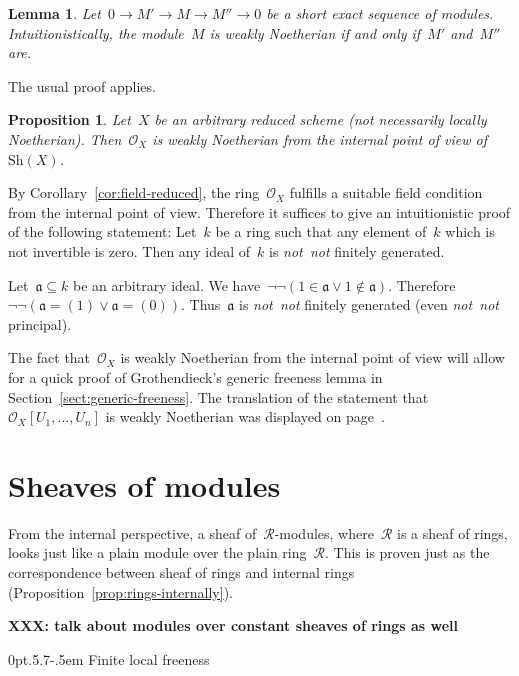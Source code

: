 \documentclass[10pt,reqno,a4paper]{amsbook}
\makeatletter
\theoremstyle{definition}
\theoremstyle{plain}
\newtheorem{prop}[defn]{Proposition}
\newtheorem{lemma}[defn]{Lemma}
\theoremstyle{remark}
\renewcommand{\O}{\mathcal{O}}
\newcommand{\R}{\mathcal{R}}
\newcommand{\aaa}{\mathfrak{a}}
\newcommand{\Sh}{\mathrm{Sh}}
\newcommand{\?}{\,{:}\,}
\renewcommand{\_}{\mathpunct{.}\,}
\newcommand{\notnot}{\emph{not~not}\xspace}
\newcommand{\XXX}[1]{\textbf{XXX: #1}}
\renewenvironment{proof}[1][\proofname]{\par
  \pushQED{\qed}%
  \normalfont \topsep6\p@\@plus6\p@\relax
  \trivlist
  \item[\hskip\labelsep
        \itshape
    #1\@addpunct{.}]\ignorespaces
}{%
  \popQED\endtrivlist\@endpefalse
}
\def\subsection{\@startsection{subsection}{2}%
  {0pt}{.5\linespacing\@plus.7\linespacing}{-.5em}%
  {\normalfont\bfseries}}
\makeatother
\begin{document}
{\begin{lemma}Let~$0 \to M' \to M \to M'' \to 0$ be a short exact sequence of
modules. Intuitionistically, the module~$M$ is weakly Noetherian if and only
if~$M'$ and~$M''$ are.
\end{lemma}

\begin{proof}The usual proof applies.\end{proof}

\begin{prop}\label{prop:ox-weakly-noetherian}
Let~$X$ be an arbitrary reduced scheme (not necessarily locally
Noetherian). Then~$\O_X$ is weakly Noetherian from the internal point of view
of~$\Sh(X)$.\end{prop}
\begin{proof}By Corollary~\ref{cor:field-reduced}, the ring~$\O_X$ fulfills a
suitable field condition from the internal point of view. Therefore it suffices
to give an intuitionistic proof of the following statement: Let~$k$ be a ring such that
any element of~$k$ which is not invertible is zero. Then any ideal of~$k$ is
\notnot finitely generated.

Let~$\aaa \subseteq k$ be an arbitrary ideal. We have~$\neg\neg(1 \in \aaa \vee
1 \not\in \aaa)$. Therefore~$\neg\neg(\aaa = (1) \vee \aaa = (0))$. Thus~$\aaa$
is \notnot finitely generated (even \notnot principal).
\end{proof}

The fact that~$\O_X$ is weakly Noetherian from the internal point of view will
allow for a quick proof of Grothendieck's generic freeness lemma in
Section~\ref{sect:generic-freeness}. The translation of the statement
that~$\O_X[U_1,\ldots,U_n]$ is weakly Noetherian was displayed on
page~\pageref{page:convoluted-statement}.

}


\section{Sheaves of modules}

From the internal perspective, a sheaf of~$\R$-modules, where~$\R$ is a sheaf
of rings, looks just like a plain module over the plain ring~$\R$. This is
proven just as the correspondence between sheaf of rings and internal rings
(Proposition~\ref{prop:rings-internally}).

\XXX{talk about modules over constant sheaves of rings as well}


\subsection{Finite local freeness}
\end{document}
